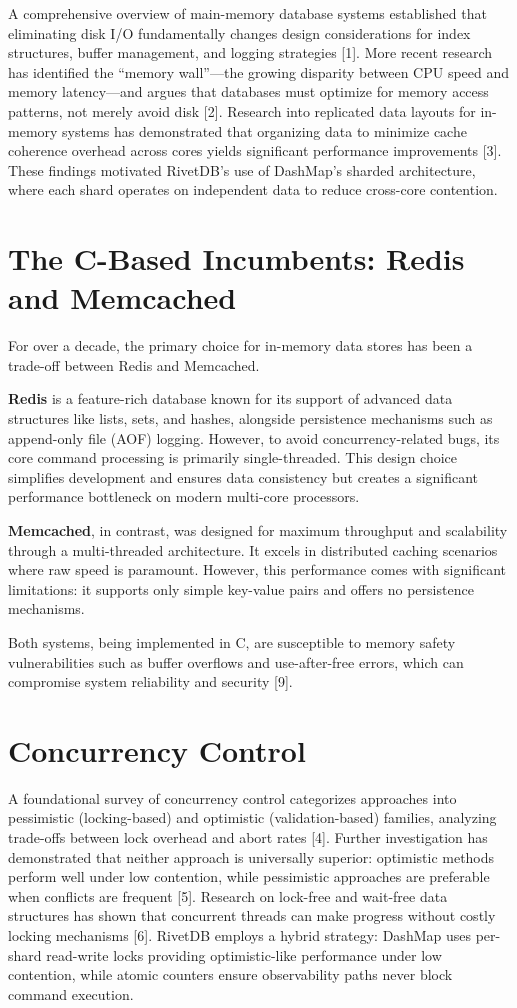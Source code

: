 \documentclass[12pt,a4paper]{report}
\begin{document}
A comprehensive overview of main-memory database systems established that eliminating disk I/O fundamentally changes design considerations for index structures, buffer management, and logging strategies [1]. More recent research has identified the ``memory wall''---the growing disparity between CPU speed and memory latency---and argues that databases must optimize for memory access patterns, not merely avoid disk [2]. Research into replicated data layouts for in-memory systems has demonstrated that organizing data to minimize cache coherence overhead across cores yields significant performance improvements [3]. These findings motivated RivetDB's use of DashMap's sharded architecture, where each shard operates on independent data to reduce cross-core contention.

\section{The C-Based Incumbents: Redis and Memcached}

For over a decade, the primary choice for in-memory data stores has been a trade-off between Redis and Memcached.

\textbf{Redis} is a feature-rich database known for its support of advanced data structures like lists, sets, and hashes, alongside persistence mechanisms such as append-only file (AOF) logging. However, to avoid concurrency-related bugs, its core command processing is primarily single-threaded. This design choice simplifies development and ensures data consistency but creates a significant performance bottleneck on modern multi-core processors.

\textbf{Memcached}, in contrast, was designed for maximum throughput and scalability through a multi-threaded architecture. It excels in distributed caching scenarios where raw speed is paramount. However, this performance comes with significant limitations: it supports only simple key-value pairs and offers no persistence mechanisms.

Both systems, being implemented in C, are susceptible to memory safety vulnerabilities such as buffer overflows and use-after-free errors, which can compromise system reliability and security [9].

\section{Concurrency Control}

A foundational survey of concurrency control categorizes approaches into pessimistic (locking-based) and optimistic (validation-based) families, analyzing trade-offs between lock overhead and abort rates [4]. Further investigation has demonstrated that neither approach is universally superior: optimistic methods perform well under low contention, while pessimistic approaches are preferable when conflicts are frequent [5]. Research on lock-free and wait-free data structures has shown that concurrent threads can make progress without costly locking mechanisms [6]. RivetDB employs a hybrid strategy: DashMap uses per-shard read-write locks providing optimistic-like performance under low contention, while atomic counters ensure observability paths never block command execution.
\end{document}
